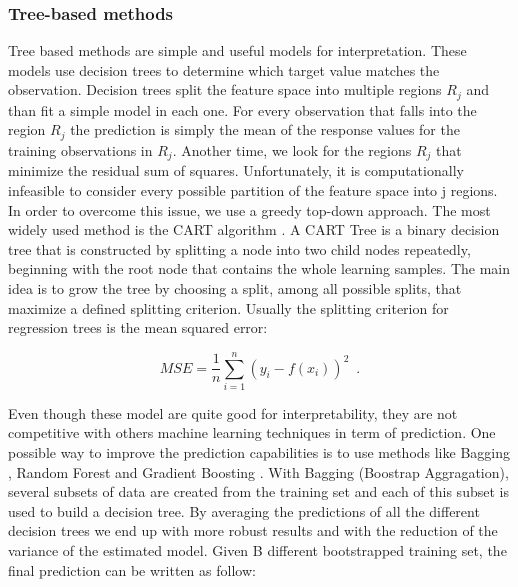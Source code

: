 \subsubsection{Tree-based methods} \label{Tree-based methods}

Tree based methods are simple and useful models for interpretation. These models use decision trees to determine which target value matches the observation. Decision trees split the feature space into multiple regions $R_j$ and than fit a simple model in each one. For every observation that falls into the region $R_j$ the prediction is simply the mean of the response values for the training observations in $R_j$. Another time, we look for the regions $R_j$ that minimize the residual sum of squares. Unfortunately, it is computationally infeasible to consider every possible partition of the feature space into j regions. In order to overcome this issue, we use a greedy top-down approach. The most widely used method is the CART algorithm \citep{breiman2017classification}. A CART Tree is a binary decision tree that is constructed by splitting a node into two child nodes repeatedly, beginning with the root node that contains the whole learning samples. The main idea is to grow the tree by choosing a split, among all possible splits, that maximize a defined splitting criterion. Usually the splitting criterion for regression trees is the mean squared error:

\begin{equation}
    MSE = \frac{1}{n}\sum_{i=1}^{n}(y_i -f(x_i))^2
    \enspace.
\end{equation}

Even though these model are quite good for interpretability, they are not competitive with others machine learning techniques in term of prediction. One possible way to improve the prediction capabilities is to use methods like Bagging \citep{breiman1996bagging}, Random Forest \citep{breiman2001random} and Gradient Boosting \citep{friedman2001greedy}.
With Bagging (Boostrap Aggragation), several subsets of data are created from the training set and each of this subset is used to build a decision tree. By averaging the predictions of all the different decision trees we end up with more robust results and with the reduction of the variance of the estimated model. Given B different bootstrapped training set, the final prediction can be written as follow:

